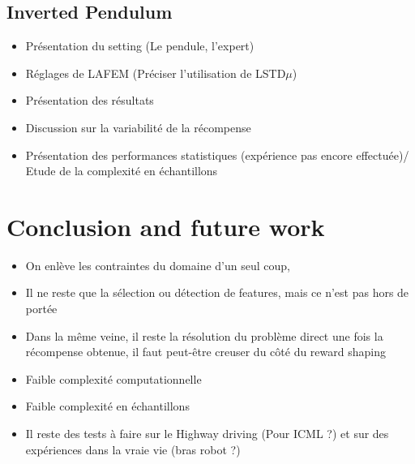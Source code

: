\documentclass[publibook-draft]{CAp2012}
\begin{document}
\subsection{Inverted Pendulum}
\begin{itemize}
\item Présentation du setting (Le pendule, l'expert)
\item Réglages de LAFEM (Préciser l'utilisation de LSTD$\mu$)
\item Présentation des résultats
\item Discussion sur la variabilité de la récompense
\item Présentation des performances statistiques (expérience pas encore effectuée)/ Etude de la complexité en échantillons 
\end{itemize}
\section{Conclusion and future work}
\begin{itemize}
\item On enlève les contraintes du domaine d'un seul coup, 
\item Il ne reste que la sélection ou détection de features, mais ce n'est pas hors de portée
\item Dans la même veine, il reste la résolution du problème direct une fois la récompense obtenue, il faut peut-être creuser du côté du reward shaping
\item Faible complexité computationnelle
\item Faible complexité en échantillons
\item Il reste des tests à faire sur le Highway driving (Pour ICML ?) et sur des expériences dans la vraie vie (bras robot ?)
\end{itemize}
%
%

\end{document}
